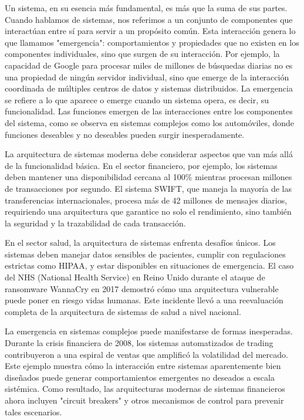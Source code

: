 Un sistema, en su esencia más fundamental, es más que la suma de sus partes. Cuando hablamos de sistemas, nos referimos a un conjunto de componentes que interactúan entre sí para servir a un propósito común. Esta interacción genera lo que llamamos "emergencia": comportamientos y propiedades que no existen en los componentes individuales, sino que surgen de su interacción. Por ejemplo, la capacidad de Google para procesar miles de millones de búsquedas diarias no es una propiedad de ningún servidor individual, sino que emerge de la interacción coordinada de múltiples centros de datos y sistemas distribuidos. La emergencia se refiere a lo que aparece o emerge cuando un sistema opera, es decir, su funcionalidad. Las funciones emergen de las interacciones entre los componentes del sistema, como se observa en sistemas complejos como los automóviles, donde funciones deseables y no deseables pueden surgir inesperadamente.

La arquitectura de sistemas moderna debe considerar aspectos que van más allá de la funcionalidad básica. En el sector financiero, por ejemplo, los sistemas deben mantener una disponibilidad cercana al 100\% mientras procesan millones de transacciones por segundo. El sistema SWIFT, que maneja la mayoría de las transferencias internacionales, procesa más de 42 millones de mensajes diarios, requiriendo una arquitectura que garantice no solo el rendimiento, sino también la seguridad y la trazabilidad de cada transacción.

En el sector salud, la arquitectura de sistemas enfrenta desafíos únicos. Los sistemas deben manejar datos sensibles de pacientes, cumplir con regulaciones estrictas como HIPAA, y estar disponibles en situaciones de emergencia. El caso del NHS (National Health Service) en Reino Unido durante el ataque de ransomware WannaCry en 2017 demostró cómo una arquitectura vulnerable puede poner en riesgo vidas humanas. Este incidente llevó a una reevaluación completa de la arquitectura de sistemas de salud a nivel nacional.

La emergencia en sistemas complejos puede manifestarse de formas inesperadas. Durante la crisis financiera de 2008, los sistemas automatizados de trading contribuyeron a una espiral de ventas que amplificó la volatilidad del mercado. Este ejemplo muestra cómo la interacción entre sistemas aparentemente bien diseñados puede generar comportamientos emergentes no deseados a escala sistémica. Como resultado, las arquitecturas modernas de sistemas financieros ahora incluyen "circuit breakers" y otros mecanismos de control para prevenir tales escenarios.

